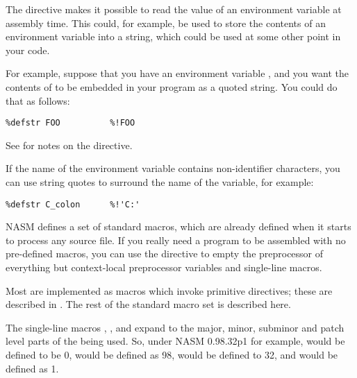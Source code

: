 
The  directive makes it possible to read the
value of an environment variable at assembly time. This could, for example,
be used to store the contents of an environment variable into a string, which
could be used at some other point in your code.

For example, suppose that you have an environment variable ,
and you want the contents of  to be embedded in your program as
a quoted string. You could do that as follows:

\begin{lstlisting}
%defstr FOO          %!FOO
\end{lstlisting}

See  for notes on the  directive.

If the name of the environment variable contains non-identifier
characters, you can use string quotes to surround the name of the
variable, for example:

\begin{lstlisting}
%defstr C_colon      %!'C:'
\end{lstlisting}


NASM defines a set of standard macros, which are already defined
when it starts to process any source file. If you really need a
program to be assembled with no pre-defined macros, you can use the
 directive to empty the preprocessor of everything
but context-local preprocessor variables and single-line macros.

Most  are implemented as macros
which invoke primitive directives; these are described in .
The rest of the standard macro set is described here.


The single-line macros , ,
 and  expand to
the major, minor, subminor and patch level parts of the 
being used. So, under NASM 0.98.32p1 for example, 
would be defined to be 0,  would be defined as 98,
 would be defined to 32, and 
would be defined as 1.

